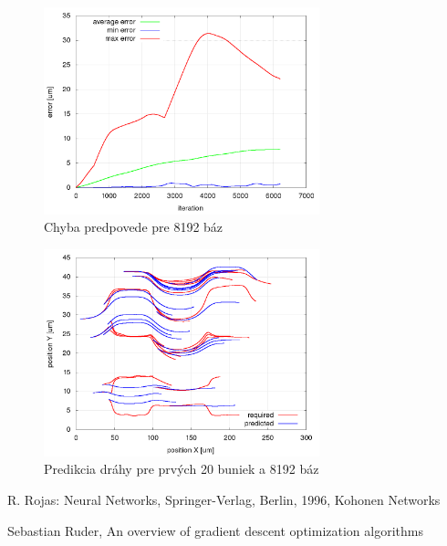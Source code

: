 \documentclass[10pt,a4paper]{article}
\begin{document}
\begin{figure}[!ht]
\centering
\includegraphics[width=8cm]{images/kanal_kika_sim6/8192_basis/summary_error_during_trajectory_reconstruction.png}
\caption{Chyba predpovede pre 8192 báz}
\label{img:id_0_prediction_error_8192_basis}
\end{figure}

\begin{figure}[!ht]
\centering
\includegraphics[width=8cm]{images/kanal_kika_sim6/8192_basis/trajectory_prediction_for_20_cells.png}
\caption{Predikcia dráhy pre prvých 20 buniek a 8192 báz}
\label{img:id_0_prediction_8192_basis}
\end{figure}















\begin{thebibliography}{9}
R. Rojas: Neural Networks, Springer-Verlag, Berlin, 1996, Kohonen Networks

Sebastian Ruder, An overview of gradient descent optimization algorithms
\end{thebibliography}
\end{document}
